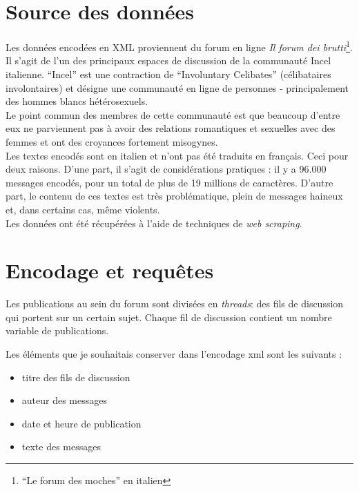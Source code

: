 \documentclass[12pt,a4paper]{article}
\begin{document}
	



\tableofcontents
\clearpage

\section{Source des données}
Les données encodées en XML proviennent du forum en ligne \emph{Il forum dei brutti}\footnote{“Le forum des moches” en italien}. Il s'agit de l'un des principaux espaces de discussion de la communauté Incel italienne. “Incel” est une contraction de “Involuntary Celibates” (célibataires involontaires) et désigne une communauté en ligne de personnes - principalement des hommes blancs hétérosexuels. \\

Le point commun des membres de cette communauté est que beaucoup d'entre eux ne parviennent pas à avoir des relations romantiques et sexuelles avec des femmes et ont des croyances fortement misogynes. \\ 
Les textes encodés sont en italien et n'ont pas été traduits en français. Ceci pour deux raisons. D'une part, il s'agit de considérations pratiques : il y a 96.000 messages encodés, pour un total de plus de 19 millions de caractères. D'autre part, le contenu de ces textes est très problématique, plein de messages haineux et, dans certains cas, même violents.\\

Les données ont été récupérées à l'aide de techniques de \emph{web scraping}.

\section{Encodage et requêtes}

Les publications au sein du forum sont divisées en \emph{threads}: des fils de discussion qui portent sur un certain sujet. Chaque fil de discussion contient un nombre variable de publications.

Les éléments que je souhaitais conserver dans l'encodage xml sont les suivants :
\begin{itemize}[label=•]
	\item titre des fils de discussion
	\item auteur des messages
	\item date et heure de publication
	\item texte des messages
\end{itemize}
\end{document}
